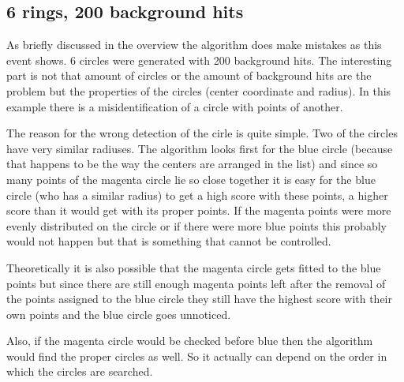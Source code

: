 \documentclass[11pt]{scrreprt}
\begin{document}

\subsection{6 rings, 200 background hits} %
\label{sub:2d_hough_transform_6_circles_200_background_hits}
As briefly discussed in the overview the algorithm does make mistakes as this event shows. 6 circles were generated with 200 background hits. The interesting part is not that amount of circles or the amount of background hits are the problem but the properties of the circles (center coordinate and radius). In this example there is a misidentification of a circle with points of another.

The reason for the wrong detection of the cirle is quite simple. Two of the circles have very similar radiuses. The algorithm looks first for the blue circle (because that happens to be the way the centers are arranged in the list) and since so many points of the magenta circle lie so close together it is easy for the blue circle (who has a similar radius) 
to get a high score with these points, a higher score than it would get with its proper points. If the magenta points were more evenly 
distributed on the circle or if there were more blue points this probably would not happen but that is something that cannot be controlled.

Theoretically it is also possible that the magenta circle gets fitted to the
blue points but since there are still enough magenta points left after the removal 
of the points assigned to the blue circle they still have the highest score with 
their own points and the blue circle goes unnoticed.

Also, if the magenta circle would be checked before blue then the algorithm
would find the proper circles as well. So it actually can depend on the order
in which the circles are searched.
\end{document}
